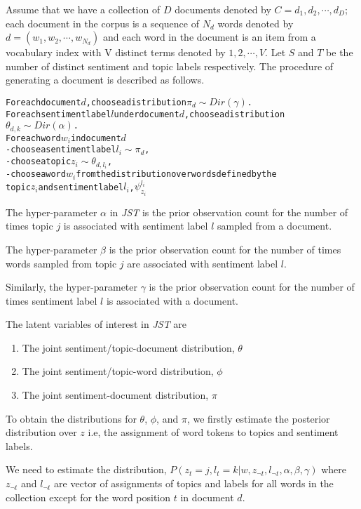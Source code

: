 Assume that we have a collection of \(D\) documents denoted by \(C = {d_1,d_2,\cdots,d_D} \); each document in the corpus is a sequence
of \(N_d\) words denoted by \(d = (w_1,w_2,\cdots,w_{N_d}) \) and each word in the document is an item from a vocabulary index with V distinct
terms denoted by \({1,2,\cdots,V}\). Let \(S\) and \(T\) be the number of distinct sentiment and topic labels respectively. The procedure of
generating a document is described as follows.

\begin{alltt}
For each document \(d\), choose a distribution \(\pi_d \sim Dir(\gamma)\).
For each sentiment label \(l\) under document \(d\), choose a distribution
\(\theta_{d,k} \sim Dir(\alpha)\).
For each word \(w_i\) in document \(d\)
  - choose a sentiment label \(l_i \sim \pi_d\),
  - choose a topic \(z_i \sim \theta_{d,l_i}\),
  - choose a word \(w_i\) from the distribution over words defined by the 
    topic \(z_i\) and sentiment label \(l_i\), \(\psi_{z_i}^{l_i}\)
\end{alltt}

The hyper-parameter \(\alpha\) in \textit{JST} is the prior observation count for the number of times topic \(j\) is associated with 
sentiment label \(l\) sampled from a document. 

The hyper-parameter \(\beta\) is the prior observation count for the number of times words sampled from topic \(j\)
are associated with sentiment label \(l\).

Similarly, the hyper-parameter \(\gamma\) is the prior observation count for the number of times sentiment label \(l\) is associated
with a document.

The latent variables of interest in \textit{JST} are
\begin{enumerate}
 \item The joint sentiment/topic-document distribution, \(\theta\)
 \item The joint sentiment/topic-word distribution, \(\phi\)
 \item The joint sentiment-document distribution, \(\pi\)
\end{enumerate}

To obtain the distributions for \(\theta\), \(\phi\), and \(\pi\), we firstly estimate the posterior distribution over \(z\) i.e, the assignment
of word tokens to topics and sentiment labels.

We need to estimate the distribution, \(P(z_t=j,l_t=k|w,z_{\neg t},l_{\neg t},\alpha,\beta,\gamma)\) where \(z_{\neg t}\) and \(l_{\neg t}\)
are vector of assignments of topics and labels for all words in the collection except for the word position \(t\) in document \(d\). 


